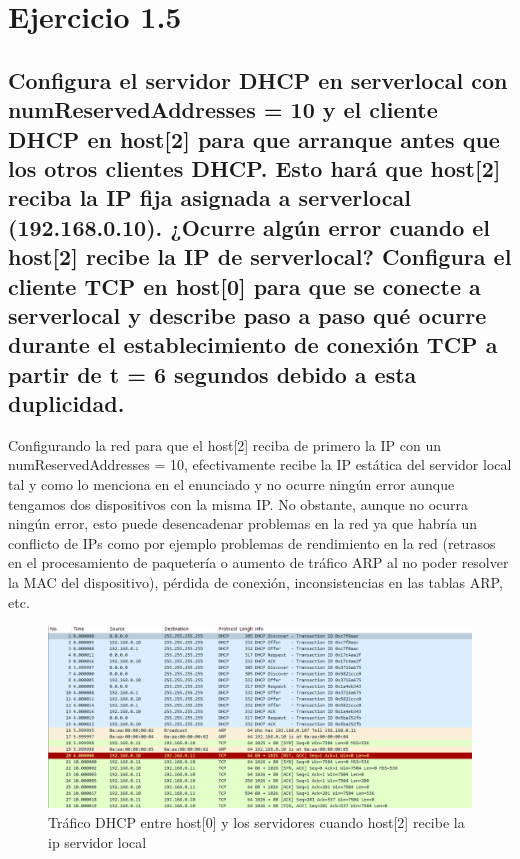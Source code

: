 \section{Ejercicio 1.5}

\subsection{Configura el servidor DHCP en serverlocal con numReservedAddresses = 10 y el cliente DHCP en host[2]
para que arranque antes que los otros clientes DHCP. Esto hará que host[2] reciba la IP fija asignada a
serverlocal (192.168.0.10). ¿Ocurre algún error cuando el host[2] recibe la IP de serverlocal? Configura el
cliente TCP en host[0] para que se conecte a serverlocal y describe paso a paso qué ocurre durante el
establecimiento de conexión TCP a partir de t = 6 segundos debido a esta duplicidad.}

Configurando la red para que el host[2] reciba de primero la IP con un numReservedAddresses = 10, efectivamente recibe la IP estática del servidor local tal y como lo menciona en el enunciado y no ocurre ningún error aunque tengamos dos dispositivos con la misma IP. No obstante, aunque no ocurra ningún error, esto puede desencadenar problemas en la red ya que habría un conflicto de IPs como por ejemplo problemas de rendimiento en la red (retrasos en el procesamiento de paquetería o aumento de tráfico ARP al no poder resolver la MAC del dispositivo),  pérdida de conexión, inconsistencias en las tablas ARP, etc.

\begin{figure}[!ht]
    \centering
    \includegraphics[width=135mm, scale=0.75]{imaxes/captura_ejer1_5.png}
    \caption{Tráfico DHCP entre host[0] y los servidores cuando host[2] recibe la ip servidor local}
    \label{fig:captura2_host0}
\end{figure}

